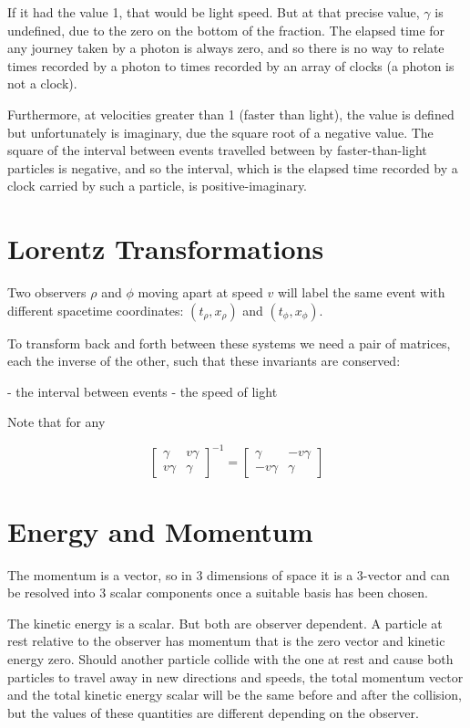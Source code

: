If it had the value 1, that would be light speed. But at that precise value, $\gamma$ is undefined, due to the zero on the bottom of the fraction. The elapsed time for any journey taken by a photon is always zero, and so there is no way to relate times recorded by a photon to times recorded by an array of clocks (a photon is not a clock).

Furthermore, at velocities greater than 1 (faster than light), the value is defined but unfortunately is imaginary, due the square root of a negative value. The square of the interval between events travelled between by faster-than-light particles is negative, and so the interval, which is the elapsed time recorded by a clock carried by such a particle, is positive-imaginary.

\section{Lorentz Transformations}

Two observers $\rho$ and $\phi$ moving apart at speed $v$ will label the same event with different spacetime coordinates: $(t_\rho, x_\rho)$ and $(t_\phi, x_\phi)$.

To transform back and forth between these systems we need a pair of matrices, each the inverse of the other, such that these invariants are conserved:

-   the interval between events
-   the speed of light

Note that for any

$$\begin{bmatrix}\gamma & v\gamma \\ v\gamma & \gamma\end{bmatrix}^{-1} = \begin{bmatrix}\gamma & -v\gamma \\ -v\gamma & \gamma\end{bmatrix}$$

\section{Energy and Momentum}

The momentum is a vector, so in 3 dimensions of space it is a 3-vector and can be resolved into 3 scalar components once a suitable basis has been chosen.

The kinetic energy is a scalar. But both are observer dependent. A particle at rest relative to the observer has momentum that is the zero vector and kinetic energy zero. Should another particle collide with the one at rest and cause both particles to travel away in new directions and speeds, the total momentum vector and the total kinetic energy scalar will be the same before and after the collision, but the values of these quantities are different depending on the observer.

